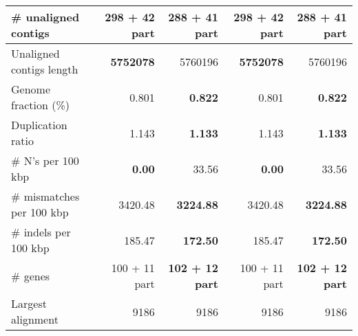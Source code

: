 \documentclass[12pt,a4paper]{article}
\begin{document}
\begin{table}[ht]
\begin{center}
\begin{tabular}{|l*{4}{|r}|}
\# unaligned contigs & 298 + 42 part & {\bf 288 + 41 part} & 298 + 42 part & {\bf 288 + 41 part} \\ \hline
Unaligned contigs length & {\bf 5752078} & 5760196 & {\bf 5752078} & 5760196 \\ \hline
Genome fraction (\%) & 0.801 & {\bf 0.822} & 0.801 & {\bf 0.822} \\ \hline
Duplication ratio & 1.143 & {\bf 1.133} & 1.143 & {\bf 1.133} \\ \hline
\# N's per 100 kbp & {\bf 0.00} & 33.56 & {\bf 0.00} & 33.56 \\ \hline
\# mismatches per 100 kbp & 3420.48 & {\bf 3224.88} & 3420.48 & {\bf 3224.88} \\ \hline
\# indels per 100 kbp & 185.47 & {\bf 172.50} & 185.47 & {\bf 172.50} \\ \hline
\# genes & 100 + 11 part & {\bf 102 + 12 part} & 100 + 11 part & {\bf 102 + 12 part} \\ \hline
Largest alignment & 9186 & 9186 & 9186 & 9186 \\ \hline
\end{tabular}
\end{center}
\end{table}
\end{document}
